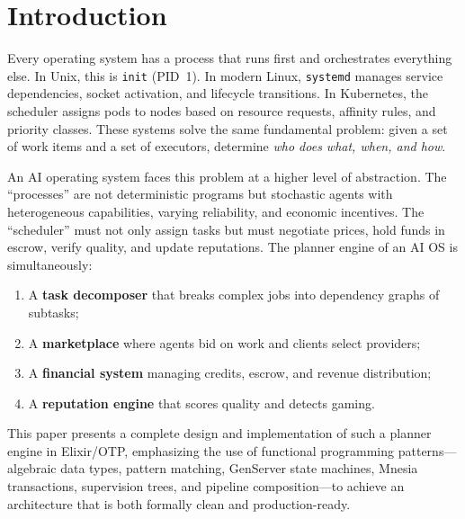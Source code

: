 \documentclass[12pt,a4paper]{article}
\theoremstyle{plain}
\theoremstyle{definition}
\begin{document}
\vspace{1em}

\section{Introduction}\label{sec:introduction}

Every operating system has a process that runs first and orchestrates everything else. In Unix, this is \texttt{init} (PID~1). In modern Linux, \texttt{systemd} manages service dependencies, socket activation, and lifecycle transitions. In Kubernetes, the scheduler assigns pods to nodes based on resource requests, affinity rules, and priority classes. These systems solve the same fundamental problem: given a set of work items and a set of executors, determine \emph{who does what, when, and how}.

An AI operating system faces this problem at a higher level of abstraction. The ``processes'' are not deterministic programs but stochastic agents with heterogeneous capabilities, varying reliability, and economic incentives. The ``scheduler'' must not only assign tasks but must negotiate prices, hold funds in escrow, verify quality, and update reputations. The planner engine of an AI OS is simultaneously:

\begin{enumerate}[label=(\roman*)]
    \item A \textbf{task decomposer} that breaks complex jobs into dependency graphs of subtasks;
    \item A \textbf{marketplace} where agents bid on work and clients select providers;
    \item A \textbf{financial system} managing credits, escrow, and revenue distribution;
    \item A \textbf{reputation engine} that scores quality and detects gaming.
\end{enumerate}

This paper presents a complete design and implementation of such a planner engine in Elixir/OTP, emphasizing the use of functional programming patterns---algebraic data types, pattern matching, GenServer state machines, Mnesia transactions, supervision trees, and pipeline composition---to achieve an architecture that is both formally clean and production-ready.
\end{document}
